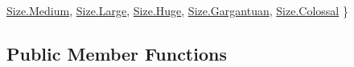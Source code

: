 \begin{DoxyCompactItemize}
\mbox{\hyperlink{class_base_unit_a4c855b587a2eecd744c4c511aeda7da1a87f8a6ab85c9ced3702b4ea641ad4bb5}{Size.\+Medium}}, 
\mbox{\hyperlink{class_base_unit_a4c855b587a2eecd744c4c511aeda7da1a3a69b34ce86dacb205936a8094f6c743}{Size.\+Large}}, 
\newline
\mbox{\hyperlink{class_base_unit_a4c855b587a2eecd744c4c511aeda7da1aa2ad65f28a717b0fd2be860a0d8e5c3e}{Size.\+Huge}}, 
\mbox{\hyperlink{class_base_unit_a4c855b587a2eecd744c4c511aeda7da1a15c00858f0c61bab56fc244aaeb165d0}{Size.\+Gargantuan}}, 
\mbox{\hyperlink{class_base_unit_a4c855b587a2eecd744c4c511aeda7da1aa541dd6c4edd4db5876452502073999a}{Size.\+Colossal}}
 \}
\end{DoxyCompactItemize}
\subsection*{Public Member Functions}
